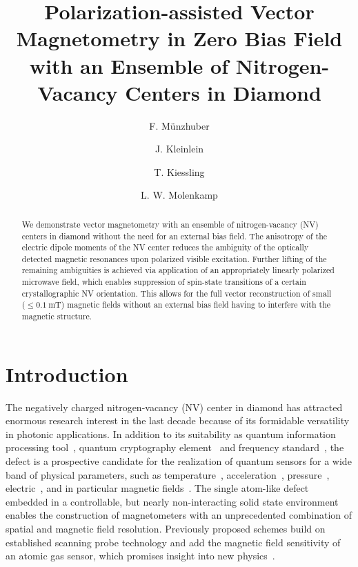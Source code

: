 \documentclass[
 reprint,
 amsmath,
 amssymb,
aps,
 prb,
showpacs
]{revtex4-1}
\begin{document}

\title{Polarization-assisted Vector Magnetometry in Zero Bias Field with an Ensemble of Nitrogen-Vacancy Centers in Diamond}

\author{F. M\"unzhuber}
\author{J. Kleinlein}
\author{T. Kiessling} 
\author{L. W. Molenkamp}
%

\begin{abstract}

We demonstrate vector magnetometry with an ensemble of nitrogen-vacancy (NV) centers in diamond without the need for an external bias field. The anisotropy of the electric dipole moments of the NV center reduces the ambiguity of the optically detected magnetic resonances upon polarized visible excitation. Further lifting of the remaining ambiguities is achieved via application of an appropriately linearly polarized microwave field, which enables suppression of spin-state transitions of a certain crystallographic NV orientation. This allows for the full vector reconstruction of small ($\leq \SI{0.1}{\milli\tesla}$) magnetic fields without an external bias field having to interfere with the magnetic structure. 

\end{abstract}


\maketitle

\section{Introduction}

The negatively charged nitrogen-vacancy (NV) center in diamond has attracted enormous research interest in the last decade because of its formidable versatility in photonic applications. In addition to its suitability as quantum information processing tool~\cite{Childress13102006}, quantum cryptography element~\cite{PhysRevLett.85.290, PhysRevA.64.061802} and frequency standard~\cite{PhysRevA.87.032118}, the defect is a prospective candidate for the realization of quantum sensors for a wide band of physical parameters, such as temperature~\cite{PRLbudkerD(T), lukind(t)}, acceleration~\cite{gyroscope}, pressure~\cite{PRLpressure}, electric~\cite{Dolde2011}, and in particular magnetic fields~\cite{Balasubramanian2008, Maze2008}. The single atom-like defect embedded in a controllable, but nearly non-interacting solid state environment enables the construction of magnetometers with an unprecedented combination of spatial and magnetic field resolution. Previously proposed schemes build on established scanning probe technology and add the magnetic field sensitivity of an atomic gas sensor, which promises insight into new physics~\cite{scannanores, scannanoresII, apldegen, budker2013optical}.
\end{document}
